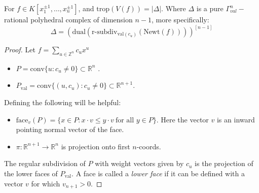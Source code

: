     \begin{theorem}
        For $f \in K[x_1^{\pm 1}, \dots, x_n^{\pm 1}]$, and $\text{trop}(V(f)) = |\Delta|$. Where $\Delta$ is a pure $\Gamma_{val}^n-$rational polyhedral complex of dimension $n-1$, more specifically:
        \begin{equation*}
            \Delta = \left(\text{dual}\left(\text{r-subdiv}_{\text{val}(c_u)}\left(\text{Newt}(f)\right)\right)\right)^{[n-1]}
        \end{equation*}
    \end{theorem}
    \begin{proof} 
       Let $f = \sum_{u \in \mathbb{Z}^n}c_ux^u$
       \begin{itemize}
           \item $P = \text{conv}\{u: c_u \neq 0\} \subset \mathbb{R}^n$ .
           \item $P_{\text{val}} = \text{conv}\{(u,c_u): c_u \neq 0\}\subset \mathbb{R}^{n+1}$.
       \end{itemize}
       Defining the following will be helpful:
       \begin{itemize}
           \item $\text{face}_v(P) = \{x \in P : x\cdot v \leq y \cdot v~ \text{for all } y \in P\}$. Here the vector $v$ is an inward pointing normal vector of the face.
           \item $\pi: \mathbb{R}^{n+1} \to \mathbb{R}^n$ is projection onto first $n$-coords.
       \end{itemize}
       The regular subdivision of $P$ with weight vectors given by $c_u$ is the projection of the lower faces of $P_{\text{val}}$.
       A face is called a \textit{lower face} if it can be defined with a vector $v$ for which $v_{n+1} > 0$.
       

\end{proof}
